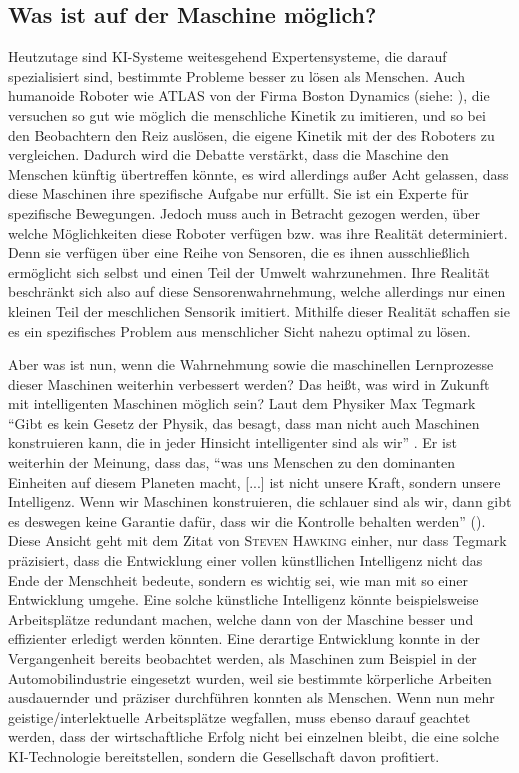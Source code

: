 \documentclass[a4paper, 11pt]{scrartcl}
\begin{document}
\subsection{Was ist auf der Maschine möglich?}
Heutzutage sind KI-Systeme weitesgehend Expertensysteme, die darauf spezialisiert sind, bestimmte Probleme besser zu lösen als Menschen. Auch humanoide Roboter wie ATLAS von der Firma Boston Dynamics (siehe: \cite{Atlas2019}), die versuchen so gut wie möglich die menschliche Kinetik zu imitieren, und so bei den Beobachtern den Reiz auslösen, die eigene Kinetik mit der des Roboters zu vergleichen. Dadurch wird die Debatte verstärkt, dass die Maschine den Menschen künftig übertreffen könnte, es wird allerdings außer Acht gelassen, dass diese Maschinen ihre spezifische Aufgabe nur erfüllt. Sie ist ein Experte für spezifische Bewegungen. Jedoch muss auch in Betracht gezogen werden, über welche Möglichkeiten diese Roboter verfügen bzw. was ihre Realität determiniert. Denn sie verfügen über eine Reihe von Sensoren, die es ihnen ausschließlich ermöglicht sich selbst und einen Teil der Umwelt wahrzunehmen. Ihre Realität beschränkt sich also auf diese Sensorenwahrnehmung, welche allerdings nur einen kleinen Teil der meschlichen Sensorik imitiert. Mithilfe dieser Realität schaffen sie es ein spezifisches Problem aus menschlicher Sicht nahezu optimal zu lösen.

Aber was ist nun, wenn die Wahrnehmung sowie die maschinellen Lernprozesse dieser Maschinen weiterhin verbessert werden? Das heißt, was wird in Zukunft mit intelligenten Maschinen möglich sein? Laut dem Physiker Max Tegmark ``Gibt es kein Gesetz der Physik, das besagt, dass man nicht auch Maschinen konstruieren kann, die in jeder Hinsicht intelligenter sind als wir'' \cite{Tegmark2017}. Er ist weiterhin der Meinung, dass das, ``was uns Menschen zu den dominanten Einheiten auf diesem Planeten macht, [...] ist nicht unsere Kraft, sondern unsere Intelligenz. Wenn wir Maschinen konstruieren, die schlauer sind als wir, dann gibt es deswegen keine Garantie dafür, dass wir die Kontrolle behalten werden'' (\cite{Tegmark2017}). Diese Ansicht geht mit dem Zitat von \textsc{Steven Hawking} einher, nur dass Tegmark präzisiert, dass die Entwicklung einer vollen künstllichen Intelligenz nicht das Ende der Menschheit bedeute, sondern es wichtig sei, wie man mit so einer Entwicklung umgehe. Eine solche künstliche Intelligenz könnte beispielsweise Arbeitsplätze redundant machen, welche dann von der Maschine besser und effizienter erledigt werden könnten. Eine derartige Entwicklung konnte in der Vergangenheit bereits beobachtet werden, als Maschinen zum Beispiel in der Automobilindustrie eingesetzt wurden, weil sie bestimmte körperliche Arbeiten ausdauernder und präziser durchführen konnten als Menschen. Wenn nun mehr geistige/interlektuelle Arbeitsplätze wegfallen, muss ebenso darauf geachtet werden, dass der wirtschaftliche Erfolg nicht bei einzelnen bleibt, die eine solche KI-Technologie bereitstellen, sondern die Gesellschaft davon profitiert.
\end{document}
